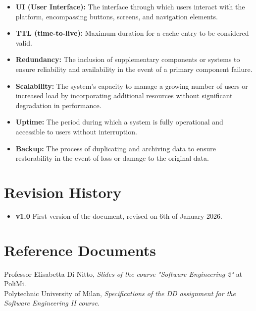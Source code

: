\documentclass{Configuration_Files/PoliMi3i_thesis}
\begin{document}
\begin{itemize}
    \item \textbf{UI (User Interface):} The interface through which users interact with the platform, encompassing buttons, screens, and navigation elements.
    \item \textbf{TTL (time-to-live):} Maximum duration for a cache entry to be considered valid.
    \item \textbf{Redundancy:} The inclusion of supplementary components or systems to ensure reliability and availability in the event of a primary component failure.
    \item \textbf{Scalability:} The system's capacity to manage a growing number of users or increased load by incorporating additional resources without significant degradation in performance.
    \item \textbf{Uptime:} The period during which a system is fully operational and accessible to users without interruption.
    \item \textbf{Backup:} The process of duplicating and archiving data to ensure restorability in the event of loss or damage to the original data.
    

\end{itemize}
\section{Revision History}
\begin{itemize}
    \item \textbf{v1.0} First version of the document, revised on 6th of January 2026.
\end{itemize}
\section{Reference Documents}
Professor Elisabetta Di Nitto, \textit{Slides of the course "Software Engineering 2"} at PoliMi.
\\ 
Polytechnic University of Milan, \textit{Specifications of the DD assignment for the Software Engineering II course}.
\end{document}
